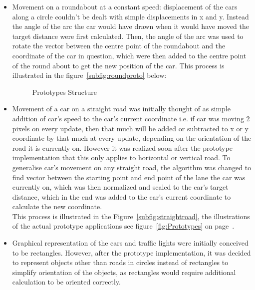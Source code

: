 \documentclass[11pt]{article}
\begin{document}
\begin{itemize}
\item Movement on a roundabout at a constant speed: displacement of the cars along a circle couldn't be dealt with simple displacements in x and y. Instead the angle of the arc the car would have drawn when it would have moved the target distance were first calculated. Then, the angle of the arc was used to rotate the vector between the centre point of the roundabout and the coordinate of the car in question, which were then added to the centre point of the round about to get the new position of the car. This process is illustrated in the figure~\ref{subfig:roundproto} below:

	\begin{figure}[!htb]
		\centering
		\caption[short for lof]{Prototypes Structure}
		\label{fig:Prototypes2}
	\end{figure}
	
\item Movement of a car on a straight road was initially thought of as simple addition of car's speed to the car's current coordinate i.e. if car was moving 2 pixels on every update, then that much will be added or subtracted to x or y coordinate by that much at every update, depending on the orientation of the road it is currently on. However it was realized soon after the prototype implementation that this only applies to horizontal or vertical road. To generalise car’s movement on any straight road, the algorithm was changed to find vector between the starting point and end point of the lane the car was currently on, which was then normalized and scaled to the car's target distance, which in the end was added to the car's current coordinate to calculate the new coordinate.\\
This process is illustrated in the Figure~\ref{subfig:straightroad}, the illustrations of the actual prototype applications see figure~\ref{fig:Prototypes} on page~\pageref{fig:Prototypes}.

 
\item Graphical representation of the cars and traffic lights were initially conceived to be rectangles. However, after the prototype implementation, it was decided to represent objects other than roads in circles instead of rectangles to simplify orientation of the objects, as rectangles would require additional calculation to be oriented correctly. 
\end{itemize}
\end{document}
